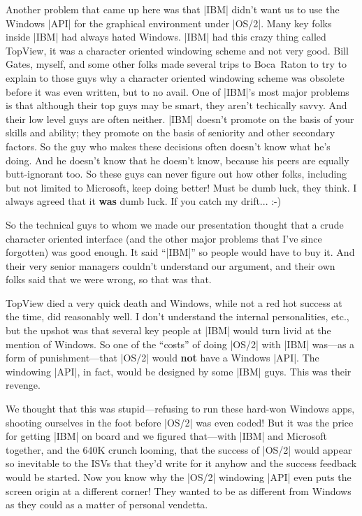 Another problem that came up here was that |IBM| didn't want us to use the
Windows |API| for the graphical environment under |OS/2|.  Many key folks
inside |IBM| had always hated Windows.  |IBM| had this crazy thing
called TopView,
it was a character oriented windowing scheme and not very good.  Bill Gates,
myself, and some other folks made several trips to Boca~Raton to try
to explain to those guys why a character oriented windowing scheme was
obsolete before it was even written, but to no avail.  One of |IBM|'s most
major problems is that although their top guys may be smart, they
aren't techically savvy.  And their low level guys are often neither.
|IBM| doesn't promote on the basis of your skills and ability; they promote
on the basis of seniority and other secondary factors.  So the guy
who makes these decisions often doesn't know what he's doing.  And he
doesn't know that he doesn't know, because his peers are equally
butt-ignorant too.  So these guys can never figure out how other folks, 
including but not limited to Microsoft, keep doing better!  Must be dumb luck, 
they think.  I always agreed that it {\bf was} dumb luck.  If you catch my
drift... :-)

So the technical guys to whom we made our presentation thought that
a crude character oriented interface (and the other major problems
that I've since forgotten) was good enough.  It said ``|IBM|'' so people would
have to buy it.  And their very senior managers couldn't understand our
argument, and their own folks said that we were wrong, so that was that.

TopView died a very quick death and Windows, while not a red hot success
at the time, did reasonably well.  I don't understand the internal
personalities, etc., but the upshot was that several key people at |IBM|
would turn livid at the mention of Windows.  So one of the ``costs'' of
doing |OS/2| with |IBM| was---as a form of punishment---that |OS/2| would
{\bf not} have a Windows |API|.  The windowing |API|, in fact, would be designed
by some |IBM| guys.  This was their revenge.

We thought that this was stupid---refusing to run
these hard-won Windows apps, shooting ourselves in the foot before |OS/2|
was even coded!  But it was the price for getting |IBM| on board and we
figured that---with |IBM| and Microsoft together, and the 640K crunch
looming, that the success of |OS/2| would appear so inevitable to the ISVs that
they'd write for it anyhow and the success feedback would be started.
Now you know why the |OS/2| windowing |API| even puts the screen origin at
a different corner!  They wanted to be as different from Windows as they
could as a matter of personal vendetta.


